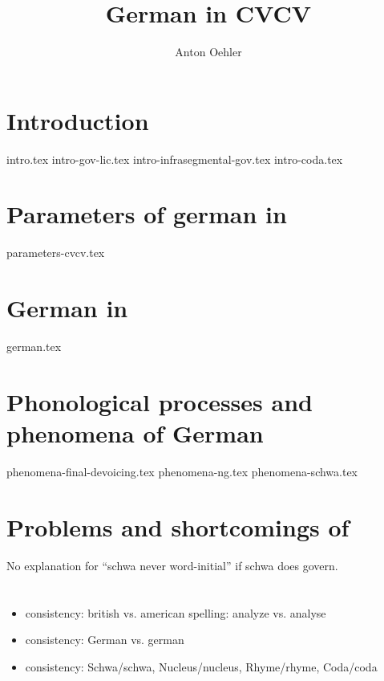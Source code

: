 \documentclass[
]{scrartcl}
\title{German in CVCV}
\author{Anton Oehler}
\begin{document}
\maketitle


\tableofcontents

\section{Introduction}
{intro.tex}
{intro-gov-lic.tex}
{intro-infrasegmental-gov.tex}
{intro-coda.tex}


\section{Parameters of german in \CVCV}
{parameters-cvcv.tex}


\section{German in \CVCV}
{german.tex}


\section{Phonological processes and phenomena of German}
{phenomena-final-devoicing.tex}
{phenomena-ng.tex}
{phenomena-schwa.tex}

\section{Problems and shortcomings of \CVCV}
No explanation for \enquote{schwa never word-initial} if schwa does govern.


\section*{\TODO{}}
\begin{itemize}
\item consistency: british vs. american spelling: analyze vs. analyse
\item consistency: German vs. german
\item consistency: Schwa/schwa, Nucleus/nucleus, Rhyme/rhyme, Coda/coda
\end{itemize}

\printbibliography
\end{document}
